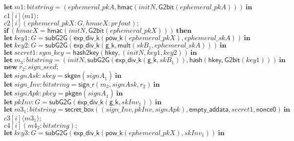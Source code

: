 \documentclass{article}
\newcommand{\cinput}[2]{{#1}({#2})}
\newcommand{\coutput}[2]{\overline{#1}\langle{#2}\rangle}
\newcommand{\kw}[1]{\mathbf{#1}}
\newcommand{\kwf}[1]{\mathsf{#1}}
\newcommand{\var}[1]{\mathit{#1}}
\newcommand{\kwt}[1]{\mathit{#1}}
\newcommand{\kwc}[1]{\mathit{#1}}
\begin{document}
\begin{tabbing}
\>$\quad \kw{let}\ \var{m1}: \kwt{bitstring} = \kwf{}(\var{ephemeral{\_}pkA}, \kwf{hmac}(\var{initN}, \kwf{G2bit}(\var{ephemeral{\_}pkA})))\ \kw{in}$\\
\>$\quad \coutput{\kwc{c1}[\var{i}]}{\var{m1}};$\\
\>$\quad \cinput{\kwc{c2}[\var{i}]}{\var{ephemeral{\_}pkX}: \kwt{G}, \var{hmacX}: \kwt{prfout}};$\\
\>$\quad \kw{if}\ (\var{hmacX}  =  \kwf{hmac}(\var{initN}, \kwf{G2bit}(\var{ephemeral{\_}pkX})))\ \kw{then}$\\
\>$\quad \kw{let}\ \var{key1}: \kwt{G} = \kwf{subG2G}(\kwf{exp{\_}div{\_}k}(\kwf{pow{\_}k}(\var{ephemeral{\_}pkX}), \var{ephemeral{\_}skA}))\ \kw{in}$\\
\>$\quad \kw{let}\ \var{key2}: \kwt{G} = \kwf{subG2G}(\kwf{exp{\_}div{\_}k}(\kwf{g{\_}k}, \kwf{mult}(\var{skB}_{1}, \var{ephemeral{\_}skA})))\ \kw{in}$\\
\>$\quad \kw{let}\ \var{secret1}: \kwt{sym{\_}key} = \kwf{hash2key}(\kwf{hkey}, \kwf{}(\var{initN}, \var{key1}, \var{key2}))\ \kw{in}$\\
\>$\quad \kw{let}\ \var{m}_{3}: \kwt{bitstring} = \kwf{}(\var{initN}, \kwf{subG2G}(\kwf{exp{\_}div{\_}k}(\kwf{g{\_}k}, \var{skB}_{1})), \kwf{hash}(\kwf{hkey}, \kwf{G2bit}(\var{key1})))\ \kw{in}$\\
\>$\quad \kw{new}\ \var{r}_{2}: \kwt{sign{\_}seed};$\\
\>$\quad \kw{let}\ \var{signAsk}: \kwt{skey} = \kwf{skgen}(\var{signA}_{1})\ \kw{in}$\\
\>$\quad \kw{let}\ \var{sign{\_}Inv}: \kwt{bitstring} = \kwf{sign{\_}r}(\var{m}_{3}, \var{signAsk}, \var{r}_{2})\ \kw{in}$\\
\>$\quad \kw{let}\ \var{signApk}: \kwt{pkey} = \kwf{pkgen}(\var{signA}_{1})\ \kw{in}$\\
\>$\quad \kw{let}\ \var{pkInv}: \kwt{G} = \kwf{subG2G}(\kwf{exp{\_}div{\_}k}(\kwf{g{\_}k}, \var{skInv}_{1}))\ \kw{in}$\\
\>$\quad \kw{let}\ \var{m3}_{1}: \kwt{bitstring} = \kwf{secret{\_}box}(\kwf{}(\var{sign{\_}Inv}, \var{pkInv}, \var{signApk}), \kwf{empty{\_}addata}, \var{secret1}, \kwf{nonce0})\ \kw{in}$\\
\>$\quad \coutput{\kwc{c3}[\var{i}]}{\var{m3}_{1}};$\\
\>$\quad \cinput{\kwc{c4}[\var{i}]}{\var{m4}_{2}: \kwt{bitstring}};$\\
\>$\quad \kw{let}\ \var{key3}: \kwt{G} = \kwf{subG2G}(\kwf{exp{\_}div{\_}k}(\kwf{pow{\_}k}(\var{ephemeral{\_}pkX}), \var{skInv}_{1}))\ \kw{in}$\\

\end{tabbing}
\end{document}

